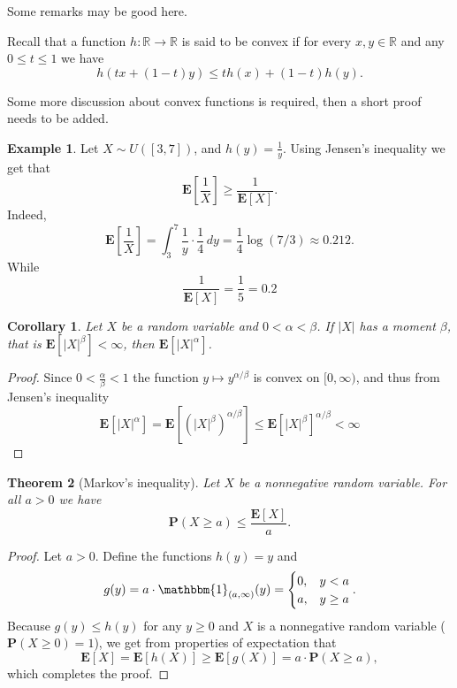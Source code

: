 \documentclass[11pt,a4paper]{article}
\theoremstyle{definition}
\newtheorem{example}{Example}[section]
\theoremstyle{plain}
\newtheorem{theorem}{Theorem}[section]
\newtheorem{corollary}[theorem]{Corollary}
\newcommand{\R}{\mathbb{R}}
\newcommand{\E}{\mathbf{E}}
\newcommand{\Prob}{\mathbf{P}}
\newcommand{\abs}[1]{\left\lvert #1\right\rvert}
\begin{document}
  Some remarks may be good here.

  Recall that a function $h \colon \R \to \R$ is said to be convex if for
  every $x,y \in \R$ and any $0 \le t \le 1$ we have
  \[
    h(t x+(1-t)y)\leq t h(x)+(1-t)h(y).
  \]

  Some more discussion about convex functions is required, then a short
  proof needs to be added.

  \begin{example}
    Let $X \sim U([3,7])$, and $h(y) = \frac{1}{y}$. Using Jensen's inequality
    we get that
    \[
      \E\left[{\frac{1}{X}}\right]\geq{\frac{1}{\E[X]}}.
    \]
    Indeed,
    \[
      \E \left[{\frac{1}{X}}\right] =
      \int_{3}^{7}{\frac{1}{y}}\cdot{\frac{1}{4}}\,dy =
      \frac{1}{4} \log(7/3) \approx
      0.212.
    \]
    While
    \[
      \frac{1}{\E[X]} = \frac{1}{5} = 0.2
    \]
  \end{example}
  
  \begin{corollary}
    Let $X$ be a random variable and $0 < \alpha < \beta$. 
    If $\abs{X}$ has a moment $\beta$, 
    that is $\E[\abs{X}^{\beta}] < \infty$,
    then $\E[\abs{X}^{\alpha}]$.
  \end{corollary}
  \begin{proof}
    Since $0 < \frac{\alpha}{\beta} < 1$ the function 
    $y \mapsto y^{\alpha/\beta}$ is convex on $[0,\infty)$, and thus from
    Jensen's inequality
    \[
      \E[|X|^{\alpha}] =
      \E[(|X|^{\beta})^{\alpha/\beta}] \leq
      \E[|X|^{\beta}]^{\alpha/\beta} <
      \infty
    \]
  \end{proof}

  \begin{theorem}[Markov's inequality]
    Let $X$ be a nonnegative random variable. For all $a > 0$ we have
    \[
      \Prob(X \geq a) \leq
      \frac{\E[X]}{a}.
    \]
  \end{theorem}
  \begin{proof}
    Let $a > 0$. Define the functions $h(y) = y$ and
    \[
      g(y) =
      a \cdot \mathbbm{1}_{(a,\infty)}(y) =
      \begin{cases}
        0, &y < a \\
        a, &y \geq a
      \end{cases}.
    \]
    Because $g(y) \le h(y)$ for any $y \geq 0$ and $X$ is a nonnegative
    random variable ($\Prob(X \geq 0) = 1$), we get from properties
    of expectation that
    \[
      \E[X] =
      \E[h(X)] \geq
      \E[g(X)] =
      a \cdot \Prob(X \geq a),
    \]
    which completes the proof.
  \end{proof}
\end{document}
